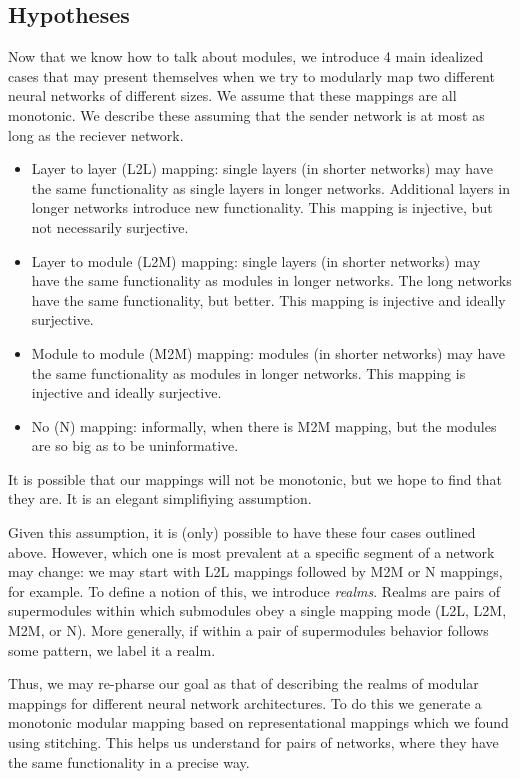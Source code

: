 \documentclass{article} %
\begin{document}
\subsection{Hypotheses}
Now that we know how to talk about modules, we introduce 4 main idealized cases that may present themselves when we
try to modularly map two different neural networks of different sizes. We assume that these mappings are all monotonic.
We describe these assuming that the sender network is at most as long as the reciever network.

\begin{itemize}
   \item Layer to layer (L2L) mapping: single layers (in shorter networks) may have the same functionality as single layers in longer networks. Additional layers in longer networks introduce new functionality. This mapping is injective, but not necessarily surjective.
   \item Layer to module (L2M) mapping: single layers (in shorter networks) may have the same functionality as modules in longer networks. The long networks have the same functionality, but better. This mapping is injective and ideally surjective.
   \item Module to module (M2M) mapping: modules (in shorter networks) may have the same functionality as modules in longer networks. This mapping is injective and ideally surjective.
   \item No (N) mapping: informally, when there is M2M mapping, but the modules are so big as to be uninformative.
\end{itemize}

It is possible that our mappings will not be monotonic, but we hope to find that they are. It is an elegant
simplifiying assumption.

Given this assumption, it is (only) possible to have these four cases outlined above. However, which one
is most prevalent at a specific segment of a network may change: we may start with L2L mappings followed by
M2M or N mappings, for example. To define a notion of this, we introduce \textit{realms}. Realms are pairs
of supermodules within which submodules obey a single mapping mode (L2L, L2M, M2M, or N).
More generally, if within a pair of supermodules behavior follows some pattern, we label it a realm.

Thus, we may re-pharse our goal as that of describing the realms of modular mappings for different
neural network architectures. To do this we generate a monotonic modular mapping based on representational
mappings which we found using stitching. This helps us understand for pairs of networks, where they have the
same functionality in a precise way.
\end{document}
